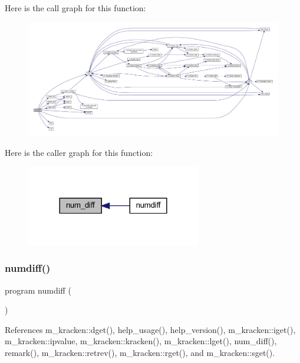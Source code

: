 Here is the call graph for this function\+:
\nopagebreak
\begin{figure}[H]
\begin{center}
\leavevmode
\includegraphics[width=350pt]{numdiff_8f90_a5bf0d2166ed3d2cb137b6084621a231f_cgraph}
\end{center}
\end{figure}
Here is the caller graph for this function\+:
\nopagebreak
\begin{figure}[H]
\begin{center}
\leavevmode
\includegraphics[width=216pt]{numdiff_8f90_a5bf0d2166ed3d2cb137b6084621a231f_icgraph}
\end{center}
\end{figure}
\mbox{\label{numdiff_8f90_a5af23474c4d2e32d7426907cf2536366}} 
\subsubsection{\texorpdfstring{numdiff()}{numdiff()}}
{\footnotesize\ttfamily program numdiff (\begin{DoxyParamCaption}{ }\end{DoxyParamCaption})}



References m\+\_\+kracken\+::dget(), help\+\_\+usage(), help\+\_\+version(), m\+\_\+kracken\+::iget(), m\+\_\+kracken\+::ipvalue, m\+\_\+kracken\+::kracken(), m\+\_\+kracken\+::lget(), num\+\_\+diff(), remark(), m\+\_\+kracken\+::retrev(), m\+\_\+kracken\+::rget(), and m\+\_\+kracken\+::sget().

